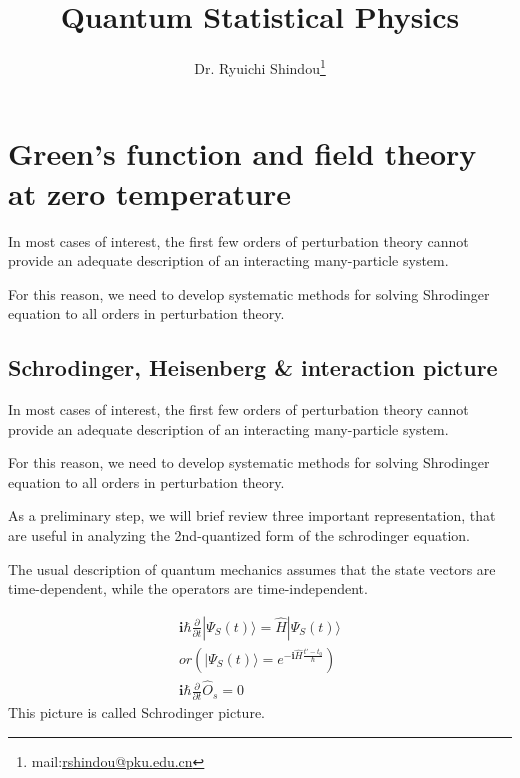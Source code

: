 ﻿\documentclass[twoside]{book}
\numberwithin{equation}{section}
\begin{document}
\title{Quantum Statistical Physics}
\author{Dr. Ryuichi Shindou\footnote{mail:\href{mailto:rshindou@pku.edu.cn}{rshindou@pku.edu.cn}}}
\maketitle


\tableofcontents







\chapter{Green's function and field theory at zero temperature}
In most cases of interest, the first few orders of perturbation theory cannot provide an adequate description of an interacting many-particle system.

 For this reason, we need to develop systematic methods for solving Shrodinger equation to all orders in perturbation theory.

\section{Schrodinger, Heisenberg \& interaction picture}

In most cases of interest, the first few orders of perturbation theory cannot provide an adequate description of an interacting many-particle system.

 For this reason, we need to develop systematic methods for solving Shrodinger equation to all orders in perturbation theory.


As a preliminary step, we will brief review three important representation, that are useful in analyzing the 2nd-quantized form of the schrodinger equation.

 The usual description of quantum mechanics assumes that the state vectors are time-dependent, while the operators are time-independent.

\begin{align}
\bm{i} \hbar \frac{\partial}{\partial t} | \Psi_S(t)\rangle=\hat{H}| \Psi_S(t)\rangle \nonumber \\
or\left(| \Psi_S(t)\rangle=e^{-\bm{i}\hat H \frac{t'-t_0}{\hbar}}\right) \nonumber \\
\bm{i} \hbar \frac{\partial}{\partial t} \hat O_s = 0 \nonumber
\end{align}
 This picture is called Schrodinger picture.
\end{document}
